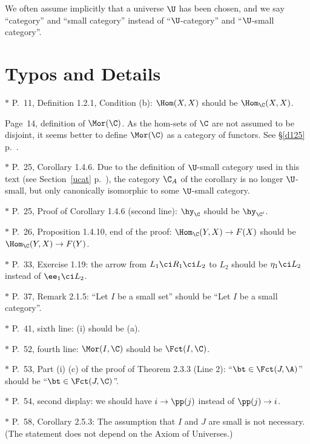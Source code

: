 \documentclass[12pt]{article}
\theoremstyle{remark}
\theoremstyle{definition}
\begin{document}
We often assume implicitly that a universe $\U$ has been chosen, and we say ``category'' and ``small category'' instead of ``$\U$-category'' and ``$\U$-small category''.


\section{Typos and Details}

$*$ P.~11, Definition 1.2.1, Condition (b): $\Hom(X,X)$ should be $\Hom_{\C}(X,X)$.

\begin{s} 
Page~14, definition of $\Mor(\C)$. As the hom-sets of $\C$ are not assumed to be disjoint, it seems better to define $\Mor(\C)$ as a category of functors. See \S\ref{d125} p.~. 
\end{s}%

\nn$*$ P.~25, Corollary 1.4.6. Due to the definition of $\U$-small category used in this text (see Section~\ref{ucat} p.~), the category $\C_A$ of the corollary is no longer $\U$-small, but only canonically isomorphic to some $\U$-small category. 

\nn$*$ P.~25, Proof of Corollary 1.4.6 (second line): $\hy_\C$ should be $\hy_{\C'}$.

\nn$*$ P.~26, Proposition 1.4.10, end of the proof: $\Hom_\C(Y,X)\to F(X)$ should be $\Hom_\C(Y,X)\to F(Y)$. 

\nn$*$ P.~33, Exercise 1.19: the arrow from $L_1\ci R_1\ci L_2$ to $L_2$ should be $\eta_1\ci L_2$ instead of $\ee_1\ci L_2$. 

\nn$*$ P.~37, Remark 2.1.5: ``Let $I$ be a small set'' should be ``Let $I$ be a small category''.

\nn$*$ P.~41, sixth line: (i) should be (a). 

\nn$*$ P.~52, fourth line: $\Mor(I,\C)$ should be $\Fct(I,\C)$.

\nn$*$ P.~53, Part (i) (c) of the proof of Theorem 2.3.3 (Line 2): ``$\bt\in\Fct(J,\A)$'' should be ``$\bt\in\Fct(J,\C)$''.

\nn$*$ P.~54, second display: we should have $i\to\pp(j)$ instead of $\pp(j)\to i$.

\nn$*$ P.~58, Corollary 2.5.3: The assumption that $I$ and $J$ are small is not necessary. (The statement does not depend on the Axiom of Universes.) 
\end{document}
